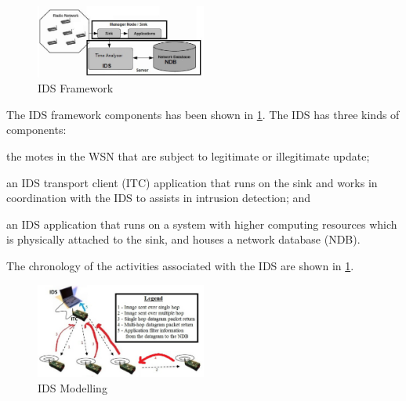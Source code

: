 \documentclass[conference,manuscript]{IEEEtran}
\begin{document}
\begin{figure}[btp]
    \centering
    \includegraphics[width=0.5\textwidth]{IDS_fw}	
    \caption{IDS Framework}
    \label{fig:ids_fw}
\end{figure}
The IDS framework components has been shown in \ref{fig:ids_fw}.
The IDS has three kinds of components:
\begin{inparaenum}
\item the motes in the WSN that are subject to legitimate or illegitimate update; 
\item an IDS transport client (ITC) application that runs on the sink and works in coordination with the IDS to assists in intrusion detection; and
\item an IDS application that runs on a system with higher computing resources which is physically attached to the sink, and houses a network database (NDB).
\end{inparaenum}
The chronology of the activities associated with the IDS  are shown in  \ref{fig:ids_fw}.
\begin{figure}[btp]
    \centering
    \includegraphics[width=0.5\textwidth]{IDS}
    \caption{IDS Modelling}
    \label{fig:ids_model}
\end{figure}
\end{document}
